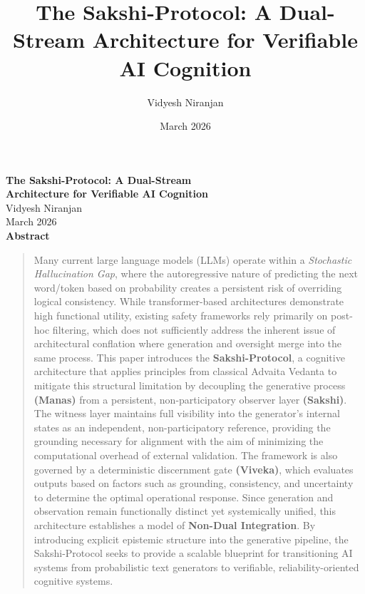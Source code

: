 \documentclass[12pt,a4paper]{article}
\title{\textbf{The Sakshi-Protocol: A Dual-Stream Architecture for Verifiable AI Cognition}}
\author{Vidyesh Niranjan}
\date{March 2026}
\begin{document}
\begin{center}
    \vspace*{-1.5cm} %
    {\LARGE \textbf{The Sakshi-Protocol: A Dual-Stream}} \\[0.4ex]
    {\LARGE \textbf{Architecture for Verifiable AI Cognition}} \\[2ex]
    
    {\large Vidyesh Niranjan} \\[1ex]
    {\small March 2026} \\[3ex]
    
    \large \textbf{Abstract}
\end{center}

\begin{quote}
\noindent
Many current large language models (LLMs) operate within a \textit{Stochastic Hallucination Gap}, where the autoregressive nature of predicting the next word/token based on probability creates a persistent risk of overriding logical consistency. While transformer-based architectures demonstrate high functional utility, existing safety frameworks rely primarily on post-hoc filtering, which does not sufficiently address the inherent issue of architectural conflation where generation and oversight merge into the same process. This paper introduces the \textbf{Sakshi-Protocol}, a cognitive architecture that applies principles from classical Advaita Vedanta to mitigate this structural limitation by decoupling the generative process \textbf{(Manas)} from a persistent, non-participatory observer layer \textbf{(Sakshi)}. The witness layer maintains full visibility into the generator’s internal states as an independent, non-participatory reference, providing the grounding necessary for alignment with the aim of minimizing the computational overhead of external validation. The framework is also governed by a deterministic discernment gate \textbf{(Viveka)}, which evaluates outputs based on factors such as grounding, consistency, and uncertainty to determine the optimal operational response. Since generation and observation remain functionally distinct yet systemically unified, this architecture establishes a model of \textbf{Non-Dual Integration}. By introducing explicit epistemic structure into the generative pipeline, the Sakshi-Protocol seeks to provide a scalable blueprint for transitioning AI systems from probabilistic text generators to verifiable, reliability-oriented cognitive systems.
\end{quote}
\end{document}
